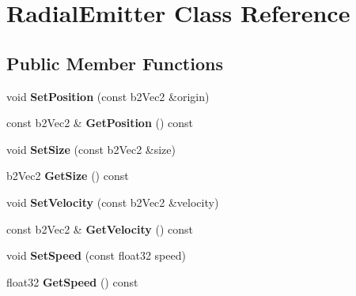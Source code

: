 \hypertarget{classRadialEmitter}{\section{Radial\-Emitter Class Reference}
\label{classRadialEmitter}
}
\subsection*{Public Member Functions}
\begin{DoxyCompactItemize}
\item 
\hypertarget{classRadialEmitter_ad6cd678da500e22790b3a2dc374e8549}{void {\bfseries Set\-Position} (const b2\-Vec2 \&origin)}\label{classRadialEmitter_ad6cd678da500e22790b3a2dc374e8549}

\item 
\hypertarget{classRadialEmitter_aeb1d185225b71e127da95932bf910dd8}{const b2\-Vec2 \& {\bfseries Get\-Position} () const }\label{classRadialEmitter_aeb1d185225b71e127da95932bf910dd8}

\item 
\hypertarget{classRadialEmitter_a3b124352b3aad592e8054fa9218c48f5}{void {\bfseries Set\-Size} (const b2\-Vec2 \&size)}\label{classRadialEmitter_a3b124352b3aad592e8054fa9218c48f5}

\item 
\hypertarget{classRadialEmitter_a959615606bd366b01026653e9fe6763e}{b2\-Vec2 {\bfseries Get\-Size} () const }\label{classRadialEmitter_a959615606bd366b01026653e9fe6763e}

\item 
\hypertarget{classRadialEmitter_acc1d88a4901decedaace742b771502d4}{void {\bfseries Set\-Velocity} (const b2\-Vec2 \&velocity)}\label{classRadialEmitter_acc1d88a4901decedaace742b771502d4}

\item 
\hypertarget{classRadialEmitter_a37f646c0d0f0d31ef8859f971d48dcfe}{const b2\-Vec2 \& {\bfseries Get\-Velocity} () const }\label{classRadialEmitter_a37f646c0d0f0d31ef8859f971d48dcfe}

\item 
\hypertarget{classRadialEmitter_aaad20e59d0c686e5154e02e43a41e8ff}{void {\bfseries Set\-Speed} (const float32 speed)}\label{classRadialEmitter_aaad20e59d0c686e5154e02e43a41e8ff}

\item 
\hypertarget{classRadialEmitter_a37b9cec093f04dcdc63134dbeedbcf03}{float32 {\bfseries Get\-Speed} () const }\label{classRadialEmitter_a37b9cec093f04dcdc63134dbeedbcf03}


\end{DoxyCompactItemize}
